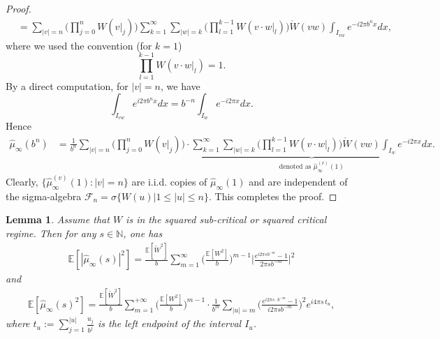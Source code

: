 \documentclass[12pt]{amsart}
\newtheorem{lemma}[theorem]{Lemma}
\theoremstyle{definition}
\theoremstyle{remark}
\newcommand{\N}{\mathbb{N}}
\newcommand{\E}{\mathbb{E}}
\numberwithin{equation}{section}
\begin{document}
\begin{proof}
\begin{align*}
&=\sum_{|v|=n}\Big(\prod_{j=0}^{n} W(v|_j)\Big) \sum_{k=1}^\infty \sum_{|w|=k} \Big( \prod_{l=1}^{k-1} W( v\cdot w|_l)  \Big) \mathring{W}(vw) \int_{I_{vw}} e^{-i 2 \pi b^n x} d x,
\end{align*}
where we used the convention (for $k=1$)
\[
 \prod_{l=1}^{k-1} W( v\cdot w|_l)  = 1. 
\]
By a direct computation,  for $|v|=n$,  we have 
\[
\int_{I_{vw}} e^{i 2 \pi b^n x} d x = b^{-n} \int_{I_w} e^{-i 2\pi x} dx. 
\]
Hence
\begin{align*}
\widehat{\mu}_{\infty}\left(b^n\right) 
&= \frac{1}{b^n}\sum_{|v|=n}\Big(\prod_{j=0}^{n} W(v|_j)\Big) \cdot  \underbrace{\sum_{k=1}^\infty \sum_{|w|=k} \Big( \prod_{l=1}^{k-1} W( v\cdot w|_l)  \Big) \mathring{W}(vw) \int_{I_{w}} e^{-i 2 \pi x} d x}_{\text{denoted as $\widehat{\mu}_\infty^{(v)}(1)$}}.
\end{align*}
Clearly,  $\{\widehat{\mu}_{\infty}^{(v)}(1): |v|=n\}$  are i.i.d. copies of $\widehat{\mu}_{\infty}(1)$ and are independent of the sigma-algebra $\mathscr{F}_{n}=\sigma\{W(u)| 1\leq |u|\leq n\}$. This completes the proof.
\end{proof}



\begin{lemma}\label{lemma-jihi}
Assume that $W$ is in the squared sub-critical or squared critical regime.  Then for any $s\in\N$, one has
\begin{align}\label{eqn-mu-s-square}
\E[|\widehat{\mu}_\infty(s)|^2]=\frac{\E[\mathring{W}^2]}{b}\sum_{m=1}^\infty \Big(\frac{\E[W^2]}{b}\Big)^{m-1}\Big|\frac{e^{i2\pi sb^{-m}}-1}{2\pi s b^{-m}}\Big|^2
\end{align}
and 
\begin{align}\label{eqn-mu-s-square-mei-mo}
\mathbb{E}\left[\widehat{\mu}_{\infty}(s)^2\right] = \frac{\E[\mathring{W}^2]}{b}\sum_{m=1}^{+\infty} \Big(\frac{ \mathbb{E}[W^2]}{b}\Big)^{m-1}  \cdot  \frac{1}{b^m}\sum_{|u|=m}\Big(\frac{e^{i 2 \pi s \cdot b^{-m}}-1}{i 2 \pi s  b^{-m}}\Big)^2 e^{i 4\pi s\, t_u},
\end{align}
where  $t_u:=\sum_{j=1}^{|u|} \frac{u_j}{b^j}$ is  the left endpoint of the interval $I_u$. 
\end{lemma}
\end{document}
